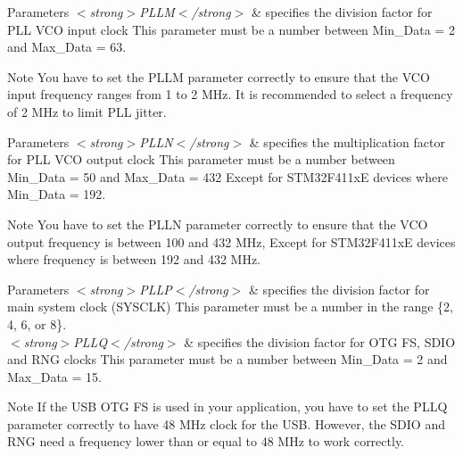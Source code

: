 \begin{DoxyParams}{Parameters}
{\em $<$strong$>$\+P\+L\+L\+M$<$/strong$>$} & specifies the division factor for P\+LL V\+CO input clock This parameter must be a number between Min\+\_\+\+Data = 2 and Max\+\_\+\+Data = 63. \\
\hline
\end{DoxyParams}
\begin{DoxyNote}{Note}
You have to set the P\+L\+LM parameter correctly to ensure that the V\+CO input frequency ranges from 1 to 2 M\+Hz. It is recommended to select a frequency of 2 M\+Hz to limit P\+LL jitter. 
\end{DoxyNote}

\begin{DoxyParams}{Parameters}
{\em $<$strong$>$\+P\+L\+L\+N$<$/strong$>$} & specifies the multiplication factor for P\+LL V\+CO output clock This parameter must be a number between Min\+\_\+\+Data = 50 and Max\+\_\+\+Data = 432 Except for S\+T\+M32\+F411xE devices where Min\+\_\+\+Data = 192. \\
\hline
\end{DoxyParams}
\begin{DoxyNote}{Note}
You have to set the P\+L\+LN parameter correctly to ensure that the V\+CO output frequency is between 100 and 432 M\+Hz, Except for S\+T\+M32\+F411xE devices where frequency is between 192 and 432 M\+Hz. 
\end{DoxyNote}

\begin{DoxyParams}{Parameters}
{\em $<$strong$>$\+P\+L\+L\+P$<$/strong$>$} & specifies the division factor for main system clock (S\+Y\+S\+C\+LK) This parameter must be a number in the range \{2, 4, 6, or 8\}.\\
\hline
{\em $<$strong$>$\+P\+L\+L\+Q$<$/strong$>$} & specifies the division factor for O\+TG FS, S\+D\+IO and R\+NG clocks This parameter must be a number between Min\+\_\+\+Data = 2 and Max\+\_\+\+Data = 15. \\
\hline
\end{DoxyParams}
\begin{DoxyNote}{Note}
If the U\+SB O\+TG FS is used in your application, you have to set the P\+L\+LQ parameter correctly to have 48 M\+Hz clock for the U\+SB. However, the S\+D\+IO and R\+NG need a frequency lower than or equal to 48 M\+Hz to work correctly. 
\end{DoxyNote}
\mbox{\label{group___r_c_c_ex___exported___macros_ga5a2fa2687b621f6eda72457d09715298}} 
